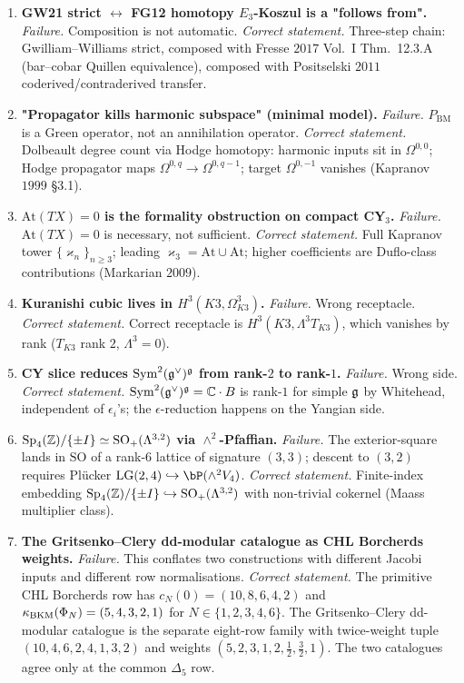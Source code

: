 \begin{theorem}
\begin{enumerate}
\item \textbf{GW21 strict $\leftrightarrow$ FG12 homotopy $E_3$-Koszul
is a "follows from".}
\emph{Failure.} Composition is not automatic.
\emph{Correct statement.} Three-step chain: Gwilliam--Williams strict, composed
with Fresse $2017$ Vol.~I Thm.~12.3.A (bar--cobar Quillen equivalence),
composed with Positselski $2011$ coderived/contraderived transfer.

\item \textbf{"Propagator kills harmonic subspace" (minimal model).}
\emph{Failure.} $P_{\mathrm{BM}}$ is a Green operator, not an
annihilation operator.
\emph{Correct statement.} Dolbeault degree count via Hodge homotopy: harmonic
inputs sit in $\Omega^{0,0}$; Hodge propagator maps
$\Omega^{0,q} \to \Omega^{0,q-1}$; target $\Omega^{0,-1}$ vanishes
(Kapranov $1999$ \S 3.1).

\item \textbf{$\mathrm{At}(TX) = 0$ is the formality obstruction on
compact CY$_3$.}
\emph{Failure.} $\mathrm{At}(TX) = 0$ is necessary, not sufficient.
\emph{Correct statement.} Full Kapranov tower $\{\varkappa_n\}_{n \geq 3}$; leading
$\varkappa_3 = \mathrm{At}\cup\mathrm{At}$; higher coefficients are
Duflo-class contributions (Markarian $2009$).

\item \textbf{Kuranishi cubic lives in $H^3(K3, \Omega^3_{K3})$.}
\emph{Failure.} Wrong receptacle.
\emph{Correct statement.} Correct receptacle is $H^3(K3, \Lambda^3 T_{K3})$, which
vanishes by rank ($T_{K3}$ rank $2$, $\Lambda^3 = 0$).

\item \textbf{CY slice reduces $\mathrm{Sym}^2(\mathfrak{g}^\vee)^{\mathfrak{g}}$ from
rank-$2$ to rank-$1$.}
\emph{Failure.} Wrong side.
\emph{Correct statement.} $\mathrm{Sym}^2(\mathfrak{g}^\vee)^{\mathfrak{g}} = \mathbb{C}\cdot B$ is
rank-$1$ for simple $\mathfrak{g}$ by Whitehead, independent of
$\epsilon_i$'s; the $\epsilon$-reduction happens on the Yangian side.

\item \textbf{$\mathrm{Sp}_4(\mathbb{Z})/\{\pm I\} \simeq \mathrm{SO}_+(\Lambda^{3,2})$
via $\wedge^2$-Pfaffian.}
\emph{Failure.} The exterior-square lands in $\mathrm{SO}$ of a
rank-$6$ lattice of signature $(3,3)$; descent to $(3,2)$ requires
Pl\"ucker $\mathrm{LG}(2,4) \hookrightarrow \bP(\wedge^2 V_4)$.
\emph{Correct statement.} Finite-index embedding
$\mathrm{Sp}_4(\mathbb{Z})/\{\pm I\} \hookrightarrow \mathrm{SO}_+(\Lambda^{3,2})$ with
non-trivial cokernel (Maass multiplier class).

\item \textbf{The Gritsenko--Clery dd-modular catalogue as CHL
Borcherds weights.}
\emph{Failure.} This conflates two constructions with different Jacobi
inputs and different row normalisations.
\emph{Correct statement.} The primitive CHL Borcherds row has
$c_N(0)=(10,8,6,4,2)$ and
$\kappa_{\mathrm{BKM}}(\Phi_N)=(5,4,3,2,1)$ for $N\in\{1,2,3,4,6\}$.  The
Gritsenko--Clery dd-modular catalogue is the separate eight-row family
with twice-weight tuple $(10,4,6,2,4,1,3,2)$ and weights
$(5,2,3,1,2,\tfrac12,\tfrac32,1)$.  The two catalogues agree only at
the common $\Delta_5$ row.


\end{enumerate}
\end{theorem}
